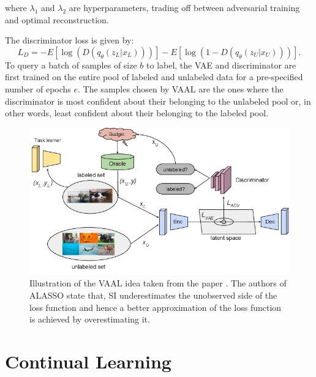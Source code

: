 where $\lambda_1$ and $\lambda_2$ are hyperparameters, trading off between adversarial training and optimal reconstruction. \par
The discriminator loss is given by:
\begin{equation}
    L_D = - E[\log(D(q_\theta (z_L | x_L)))] - E[\log (1- D(q_\theta (z_U | x_U)))].
\end{equation}
To query a batch of samples of size $b$ to label, the  VAE and discriminator are first trained on the entire pool of labeled and unlabeled data for a pre-specified number of epochs $e$. The samples chosen by VAAL
are the ones where the discriminator is most confident about their belonging to the unlabeled pool or, in other words, least confident about their belonging to the labeled pool.
\begin{figure} [ht]
    \centering
    \includegraphics[width=.9\linewidth]{images/Vaal_idea.png}
    \caption[Visualization of VAAL]{Illustration of the VAAL idea taken from the paper \cite{sinha2019variational}. The authors of ALASSO state that, SI underestimates the 
    unobserved side of the loss function and hence a better approximation of the loss function is achieved by overestimating it.}
    \label{fig:VAAL}
\end{figure}

\section{Continual Learning}
\label{sec:Related_work:Continual_Learning}
